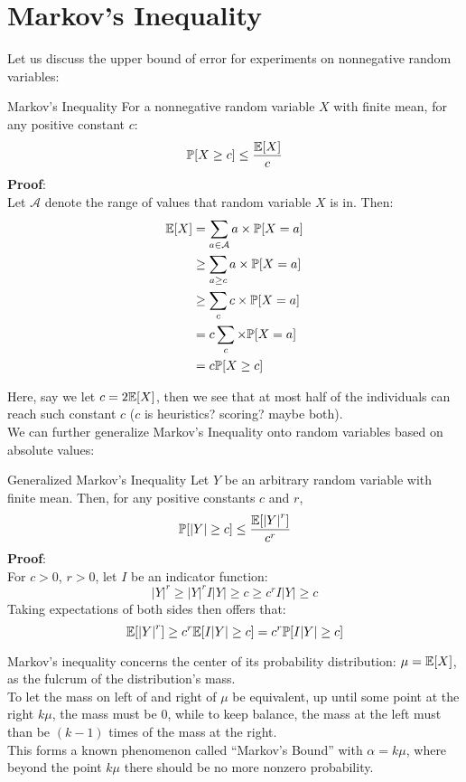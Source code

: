 \section{Markov's Inequality}
Let us discuss the upper bound of error for experiments on nonnegative random variables:
\begin{ln-theorem}{Markov's Inequality}{}
    For a nonnegative random variable $X$ with finite mean, for any positive constant $c$:
    \[
        \mathbb{P}[X \geq c] \leq \frac{\mathbb{E}[X]}{c}
    \]
    \tcblower
    \textbf{Proof}: \\
    Let $\mathcal{A}$ denote the range of values that random variable $X$ is in. Then:
    \begin{align*}
        \mathbb{E}[X]
        &= \sum_{a \in \mathcal{A}} a \times \mathbb{P}[X = a] \\
        &\geq \sum_{a \geq c} a \times \mathbb{P}[X = a] \\
        &\geq \sum_{c} c \times \mathbb{P}[X = a] \\
        &= c \sum_{c} \times \mathbb{P}[X = a] \\
        &= c \mathbb{P}[X \geq c]
    \end{align*}
\end{ln-theorem}
Here, say we let $c = 2 \mathbb{E}[X]$, then we see that at most half of the individuals can reach such constant $c$ ($c$ is heuristics? scoring? maybe both). \\
We can further generalize Markov's Inequality onto random variables based on absolute values:
\begin{ln-theorem}{Generalized Markov's Inequality}{}
    Let $Y$ be an arbitrary random variable with finite mean. Then, for any positive constants $c$ and $r$,
    \[
        \mathbb{P}[|Y| \geq c] \leq \frac{\mathbb{E}[{|Y|}^r]}{c^r}
    \]
    \tcblower
    \textbf{Proof}: \\
    For $c > 0$, $r > 0$, let $I$ be an indicator function:
    \[
        {|Y|}^r \geq {|Y|}^r I{|Y| \geq c} \geq c^r I{|Y| \geq c}
    \]
    Taking expectations of both sides then offers that:
    \[
        \mathbb{E}[{|Y|}^r] \geq c^r \mathbb{E}[I{|Y| \geq c}] = c^r \mathbb{P}[I{|Y| \geq c}]
    \]
\end{ln-theorem}
Markov's inequality concerns the center of its probability distribution: $\mu = \mathbb{E}[X]$, as the fulcrum of the distribution's mass. \\
To let the mass on left of and right of $\mu$ be equivalent, up until some point at the right $k \mu$, the mass must be $0$, while to keep balance, the mass at the left must than be $(k - 1)$ times of the mass at the right. \\
This forms a known phenomenon called ``Markov's Bound'' with $\alpha = k \mu$, where beyond the point $k \mu$ there should be no more nonzero probability.

